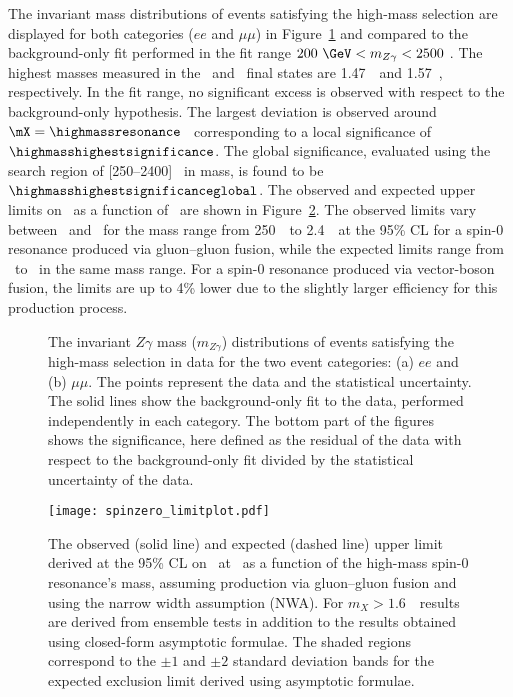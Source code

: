 The invariant mass distributions of events satisfying the 
high-mass selection are
displayed for both categories ($ee$ and $\mu\mu$) in Figure~\ref{fig:mllg-high-mass} and compared to the
background-only fit performed in the fit range $200~\GeV < m_{Z\gamma} < 2500$ \GeV. 
The highest masses measured in the \eeg\ and \mmg\ final states are
1.47~\TeV\ and 1.57~\TeV, respectively.
In the fit range, no significant excess is 
observed with respect to the background-only hypothesis. 
The largest deviation is observed around $\mX = \highmassresonance$ \GeV\
corresponding to a local significance of $\highmasshighestsignificance$.
The global significance, evaluated using the search region of 
[250--2400] \GeV\ in mass, is found to be $\highmasshighestsignificanceglobal$.
The observed and expected upper limits on \sigxbr~as a function of \mX\ are shown in Figure~\ref{fig:limit-high-mass}.
The observed limits vary between \highmasslimitlowmX\ 
and \highmasslimithighmX~for the mass range from 250~\GeV\ to 2.4~\TeV\
at the 95\% CL for a spin-0 resonance produced via gluon--gluon fusion, 
while the expected limits range from 
\highmasslimitlowmXexp\
to \highmasslimithighmXexp\ in the same mass range. For a spin-0 resonance produced via vector-boson fusion, the
limits are up to 4\% lower due to the slightly larger efficiency for this production process.


\begin{figure}
\begin{center}
%
\end{center}
\caption{The invariant $Z\gamma$ mass ($m_{Z\gamma}$) distributions of events satisfying the 
high-mass selection in data for the two event categories:
(a) $ee$ and (b) $\mu\mu$.
The points represent the data and the statistical uncertainty. The solid lines show the
background-only fit to the data, performed independently in each category. 
The bottom part of the figures shows the significance, here defined as the residual of the data with 
respect to 
the background-only fit divided by the statistical uncertainty of the data.}
\label{fig:mllg-high-mass}
\end{figure}


\begin{figure}
\begin{center}
\texttt{[image: spinzero\_limitplot.pdf]}
\end{center}
\caption{The observed (solid line) and expected (dashed line) upper limit derived at the 95\% CL
on \sigxbr~at \sqtt~as a function of the high-mass spin-0 resonance's mass, 
assuming production via gluon--gluon fusion and using the narrow width assumption (NWA).
For $m_X> 1.6$~\TeV\ results are derived from ensemble tests in addition to the results obtained 
using closed-form asymptotic formulae.
The shaded regions correspond to the $\pm 1$ and $\pm 2$ standard deviation bands for the expected 
exclusion limit derived using asymptotic formulae.}
\label{fig:limit-high-mass}
\end{figure}



